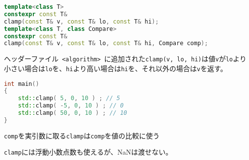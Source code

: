 %

\bgroup
\begin{lstlisting}[language=C++]
template<class T>
constexpr const T&
clamp(const T& v, const T& lo, const T& hi);
template<class T, class Compare>
constexpr const T&
clamp(const T& v, const T& lo, const T& hi, Compare comp);
\end{lstlisting}
\egroup

ヘッダーファイル~\lstinline!<algorithm>!~に追加された\lstinline!clamp(v, lo, hi)!は値\lstinline!v!が\lstinline!lo!より小さい場合は\lstinline!lo!を、\lstinline!hi!より高い場合は\lstinline!hi!を、それ以外の場合は\lstinline!v!を返す。

\begin{lstlisting}[language=C++]
int main()
{
    std::clamp( 5, 0, 10 ) ; // 5
    std::clamp( -5, 0, 10 ) ; // 0
    std::clamp( 50, 0, 10 ) ; // 10
}
\end{lstlisting}

\lstinline!comp!を実引数に取る\lstinline!clamp!は\lstinline!comp!を値の比較に使う

\lstinline!clamp!には浮動小数点数も使えるが、NaNは渡せない。
